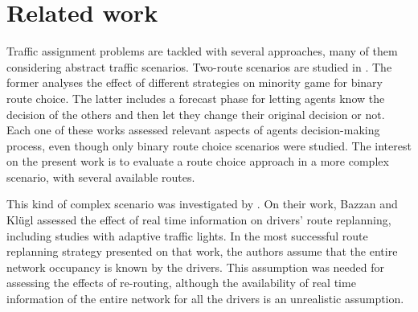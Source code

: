 \documentclass[12pt]{llncs}
\begin{document}
\section{Related work}
\label{sec:related}




Traffic assignment problems are tackled with several approaches, many of them considering abstract traffic scenarios. Two-route scenarios are studied in \cite{Bazzan+2000icmas,Kluegl&Bazzan2004}. The former analyses the effect of different strategies on minority game for binary route choice. The latter includes a forecast phase for letting agents know the decision of the others and then let they change their original decision or not. Each one of these works assessed relevant aspects of agents decision-making process, even though only binary route choice scenarios were studied. The interest on the present work is to evaluate a route choice approach in a more complex scenario, with several available routes.

This kind of complex scenario was investigated by \cite{Bazzan&Kluegl2008}. On their work, Bazzan and Kl\"ugl assessed the effect of real time information on drivers' route replanning, including studies with adaptive traffic lights. In the most successful route replanning strategy presented on that work, the authors assume that the entire network occupancy is known by the drivers. This assumption was needed for assessing the effects of re-routing, although the availability of real time information of the entire network for all the drivers is an unrealistic assumption.
\end{document}
